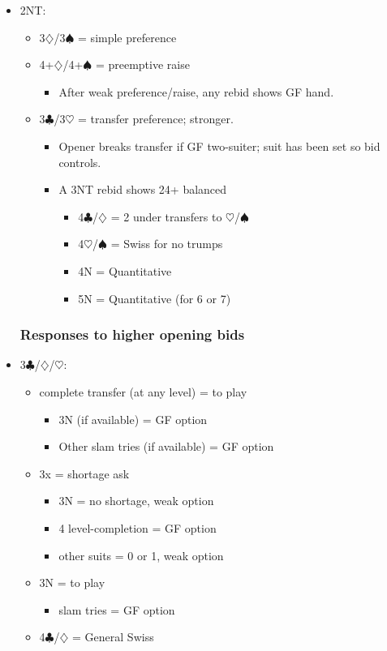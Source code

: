 \documentclass[a4paper,14pt]{extarticle}
\begin{document}
\begin{itemize}
\item 2NT:
	\begin{itemize}
   \item 3$\diamondsuit$/3$\spadesuit$ = simple preference
   \item 4+$\diamondsuit$/4+$\spadesuit$ = preemptive raise
		\begin{itemize}
      \item After weak preference/raise, any rebid shows GF hand.
		\end{itemize}
   \item 3$\clubsuit$/3$\heartsuit$ = transfer preference; stronger.
		\begin{itemize}
      \item Opener breaks transfer if GF two-suiter; suit has been set so bid controls.
      \item A 3NT rebid shows 24+ balanced
			\begin{itemize}
         \item 4$\clubsuit$/$\diamondsuit$ = 2 under transfers to $\heartsuit$/$\spadesuit$
         \item 4$\heartsuit$/$\spadesuit$ = Swiss for no trumps 
         \item 4N = Quantitative
         \item 5N = Quantitative (for 6 or 7)
			\end{itemize}
		\end{itemize}
	\end{itemize}

\subsubsection{Responses to higher opening bids}
\label{sec:resp:higher}

\item 3$\clubsuit$/$\diamondsuit$/$\heartsuit$:
	\begin{itemize}
	\item complete transfer (at any level) = to play
		\begin{itemize}
		\item 3N (if available) = GF option
		\item Other slam tries (if available) = GF option
		\end{itemize}
	\item 3x = shortage ask
		\begin{itemize}
		\item 3N = no shortage, weak option
		\item 4 level-completion = GF option
		\item other suits = 0 or 1, weak option
		\end{itemize}
	\item 3N = to play
		\begin{itemize}
		\item slam tries = GF option
		\end{itemize}
	\item 4$\clubsuit$/$\diamondsuit$ = General Swiss~
	\end{itemize}


\end{itemize}
\end{document}
